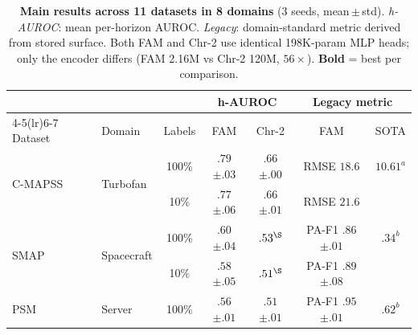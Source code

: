 \documentclass{article}
\begin{document}
\begin{table}[t]
  \centering
  \caption{\textbf{Main results across 11 datasets in 8 domains} (3 seeds, mean\,{\scriptsize$\pm$}\,std). \emph{h-AUROC}: mean per-horizon AUROC. \emph{Legacy}: domain-standard metric derived from stored surface. Both FAM and Chr-2 use identical 198K-param MLP heads; only the encoder differs (FAM 2.16M vs Chr-2 120M, $56{\times}$). \textbf{Bold} = best per comparison.}
  \label{tab:benchmark}
  \footnotesize
  \setlength{\tabcolsep}{3.5pt}
  \begin{tabular*}{\columnwidth}{@{\extracolsep{\fill}}llccccc@{}}
    \toprule
    &            & & \multicolumn{2}{c}{\textbf{h-AUROC}} & \multicolumn{2}{c}{\textbf{Legacy metric}} \\
    \cmidrule(lr){4-5}\cmidrule(lr){6-7}
    Dataset       & Domain     & Labels & FAM          & Chr-2        & FAM          & SOTA \\
    \midrule
    \multirow{2}{*}{C-MAPSS}
    & \multirow{2}{*}{Turbofan}
    & 100\% & $\mathbf{.79}${\scriptsize$\pm.03$} & $.66${\scriptsize$\pm.00$} & RMSE $18.6$           & $\mathbf{10.61}^{a}$ \\
    &            & 10\%  & $\mathbf{.77}${\scriptsize$\pm.06$} & $.66${\scriptsize$\pm.01$} & RMSE $21.6$           & \\
    \midrule
    \multirow{2}{*}{SMAP}
    & \multirow{2}{*}{Spacecraft}
    & 100\% & $\mathbf{.60}${\scriptsize$\pm.04$} & $.53^{\S}$   & PA-F1 $\mathbf{.86}${\scriptsize$\pm.01$}  & $.34^{b}$ \\
    &            & 10\%  & $.58${\scriptsize$\pm.05$}          & $.51^{\S}$   & PA-F1 $.89${\scriptsize$\pm.08$} & \\
    \multirow{2}{*}{PSM}
    & \multirow{2}{*}{Server}
    & 100\% & $\mathbf{.56}${\scriptsize$\pm.01$} & $.51${\scriptsize$\pm.01$} & PA-F1 $\mathbf{.95}${\scriptsize$\pm.01$} & $.62^{b}$ \\

\end{tabular*}
\end{table}
\end{document}
